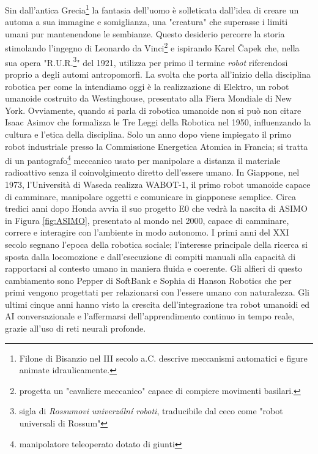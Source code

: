 Sin dall'antica Grecia\footnote{Filone di Bisanzio nel III secolo a.C. descrive meccanismi automatici e figure animate idraulicamente.} la fantasia dell'uomo è solleticata dall'idea di creare un automa a sua immagine e somiglianza, una "creatura" che superasse i limiti umani pur mantenendone le sembianze. Questo desiderio percorre la storia stimolando l'ingegno di Leonardo da Vinci\footnote{progetta un "cavaliere meccanico" capace di compiere movimenti basilari.} e ispirando Karel Čapek che, nella sua opera "R.U.R.\footnote{sigla di \textit{Rossumovi univerzální roboti}, traducibile dal ceco come "robot universali di Rossum"}" del 1921, utilizza per primo il termine \textit{robot} riferendosi proprio a degli automi antropomorfi\cite{wikipediaRUR}. La svolta che porta all'inizio della disciplina robotica per come la intendiamo oggi è la realizzazione di Elektro\cite{wikipediaElektro}, un robot umanoide costruito da Westinghouse, presentato alla Fiera Mondiale di New York. Ovviamente, quando si parla di robotica umanoide non si può non citare Isaac Asimov che formalizza le Tre Leggi della Robotica\cite{britannicaThreeLaws} nel 1950, influenzando la cultura e l'etica della disciplina. Solo un anno dopo viene impiegato il primo robot industriale\cite{avizzano2005robotica} presso la Commissione Energetica Atomica in Francia; si tratta di un pantografo\footnote{manipolatore teleoperato dotato di giunti} meccanico usato per manipolare a distanza il materiale radioattivo senza il coinvolgimento diretto dell'essere umano. In Giappone, nel 1973, l'Università di Waseda realizza WABOT-1\cite{wabotHistory}, il primo robot umanoide capace di camminare, manipolare oggetti e comunicare in giapponese semplice. Circa tredici anni dopo Honda avvia il suo progetto E0 che vedrà la nascita di ASIMO\cite{wikipediaAsimo} in Figura \ref{fig:ASIMO}, presentato al mondo nel 2000, capace di camminare, correre e interagire con l'ambiente in modo autonomo. I primi anni del XXI secolo segnano l'epoca della robotica sociale; l'interesse principale della ricerca si sposta dalla locomozione e dall'esecuzione di compiti manuali alla capacità di rapportarsi al contesto umano in maniera fluida e coerente. Gli alfieri di questo cambiamento sono Pepper di SoftBank\cite{pepperSoftbank2025} e Sophia di Hanson Robotics\cite{sophiaHanson2025} che per primi vengono progettati per relazionarsi con l'essere umano con naturalezza. Gli ultimi cinque anni hanno visto la crescita dell'integrazione tra robot umanoidi ed AI conversazionale e l'affermarsi dell'apprendimento continuo in tempo reale, grazie all'uso di reti neurali profonde.


